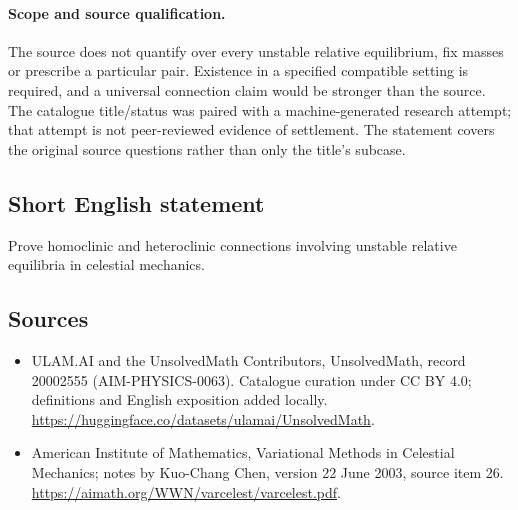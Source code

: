 \documentclass[11pt]{article}
\begin{document}
\paragraph{Scope and source qualification.}The source does not quantify over every unstable relative equilibrium, fix masses or prescribe a particular pair. Existence in a specified compatible setting is required, and a universal connection claim would be stronger than the source. The catalogue title/status was paired with a machine-generated research attempt; that attempt is not peer-reviewed evidence of settlement. The statement covers the original source questions rather than only the title’s subcase.
\subsection{Short English statement}
Prove homoclinic and heteroclinic connections involving unstable relative equilibria in celestial mechanics.
\subsection{Sources}
\begin{itemize}
\item[\hypertarget{source:20002555:1}{S1}] ULAM.AI and the UnsolvedMath Contributors, UnsolvedMath, record 20002555 (AIM-PHYSICS-0063). Catalogue curation under CC BY 4.0; definitions and English exposition added locally.
\url{https://huggingface.co/datasets/ulamai/UnsolvedMath}.
\item[\hypertarget{source:20002555:2}{S2}] American Institute of Mathematics, Variational Methods in Celestial Mechanics; notes by Kuo-Chang Chen, version 22 June 2003, source item 26.
\url{https://aimath.org/WWN/varcelest/varcelest.pdf}.
\end{itemize}
\label{end:20002555}
\end{document}
